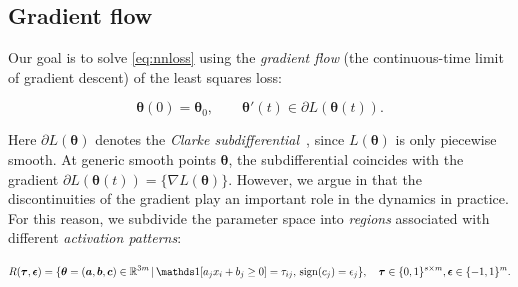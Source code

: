 

\subsection{Gradient flow}

Our goal is to solve \eqref{eq:nnloss} using the \emph{gradient flow} (the continuous-time limit of gradient descent) of the least squares loss:

\begin{equation}\label{eq:gradient_flow}
    \bm \theta(0) = \bm \theta_0, \qquad \bm \theta'(t) \in \partial L(\bm \theta(t)).
\end{equation}

Here $\partial L(\bm \theta)$
denotes the \emph{Clarke subdifferential}~\cite{clarke1975generalized}, since $L(\bm \theta)$ is only piecewise smooth. At generic smooth points $\bm \theta$, the subdifferential coincides with the gradient $\partial L(\bm \theta(t)) = \{\nabla L(\bm \theta)\}$. However, we argue in  that the discontinuities of the gradient play an important role in the dynamics in practice. For this reason, we subdivide the parameter space into \emph{regions} associated with different \emph{activation patterns}: 

\begin{equation}
    R(\bm \tau,\bm \epsilon) = \{\bm \theta = (\bm a, \bm b, \bm c) \in \RR^{3m} \, | \, \mathds 1 [a_j x_i + b_j \ge 0] = \tau_{ij},\, {\rm sign}(c_j) = \epsilon_j\}, \quad \bm \tau \in \{0,1\}^{s \times m}, \bm \epsilon \in \{-1,1\}^{m}.
\end{equation}


